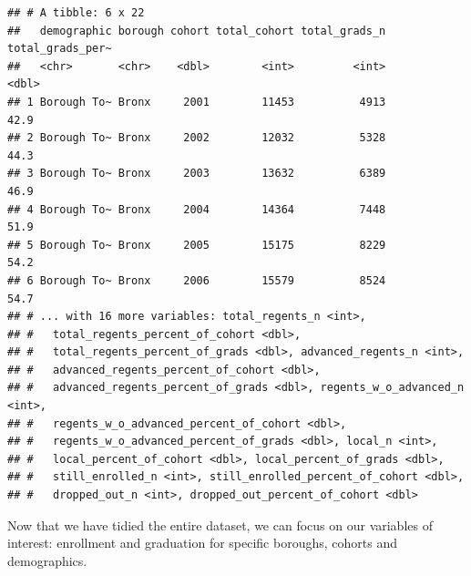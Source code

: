 \documentclass[
  english,
  man, fleqn, noextraspace]{apa6}
\newenvironment{Shaded}{\begin{snugshade}}{\end{snugshade}}
\newcommand{\DataTypeTok}[1]{\textcolor[rgb]{0.13,0.29,0.53}{#1}}
\newcommand{\DecValTok}[1]{\textcolor[rgb]{0.00,0.00,0.81}{#1}}
\newcommand{\KeywordTok}[1]{\textcolor[rgb]{0.13,0.29,0.53}{\textbf{#1}}}
\newcommand{\NormalTok}[1]{#1}
\newcommand{\OperatorTok}[1]{\textcolor[rgb]{0.81,0.36,0.00}{\textbf{#1}}}
\newcommand{\OtherTok}[1]{\textcolor[rgb]{0.56,0.35,0.01}{#1}}
\newcommand{\StringTok}[1]{\textcolor[rgb]{0.31,0.60,0.02}{#1}}
\begin{document}
\begin{Shaded}
\end{Shaded}

\begin{verbatim}
## # A tibble: 6 x 22
##   demographic borough cohort total_cohort total_grads_n total_grads_per~
##   <chr>       <chr>    <dbl>        <int>         <int>            <dbl>
## 1 Borough To~ Bronx     2001        11453          4913             42.9
## 2 Borough To~ Bronx     2002        12032          5328             44.3
## 3 Borough To~ Bronx     2003        13632          6389             46.9
## 4 Borough To~ Bronx     2004        14364          7448             51.9
## 5 Borough To~ Bronx     2005        15175          8229             54.2
## 6 Borough To~ Bronx     2006        15579          8524             54.7
## # ... with 16 more variables: total_regents_n <int>,
## #   total_regents_percent_of_cohort <dbl>,
## #   total_regents_percent_of_grads <dbl>, advanced_regents_n <int>,
## #   advanced_regents_percent_of_cohort <dbl>,
## #   advanced_regents_percent_of_grads <dbl>, regents_w_o_advanced_n <int>,
## #   regents_w_o_advanced_percent_of_cohort <dbl>,
## #   regents_w_o_advanced_percent_of_grads <dbl>, local_n <int>,
## #   local_percent_of_cohort <dbl>, local_percent_of_grads <dbl>,
## #   still_enrolled_n <int>, still_enrolled_percent_of_cohort <dbl>,
## #   dropped_out_n <int>, dropped_out_percent_of_cohort <dbl>
\end{verbatim}

Now that we have tidied the entire dataset, we can focus on our variables of interest: enrollment and graduation for specific boroughs, cohorts and demographics.
\end{document}
